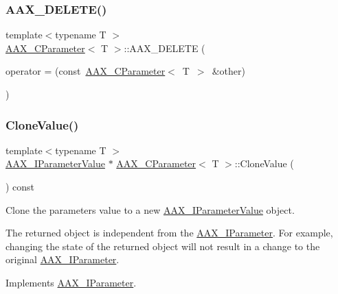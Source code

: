 \subsubsection{\texorpdfstring{AAX\_DELETE()}{AAX\_DELETE()}\hspace{0.1cm}{\footnotesize\ttfamily [3/3]}}
{\footnotesize\ttfamily template$<$typename T $>$ \\
\mbox{\hyperlink{a01537}{A\+A\+X\+\_\+\+C\+Parameter}}$<$ T $>$\+::A\+A\+X\+\_\+\+D\+E\+L\+E\+TE (\begin{DoxyParamCaption}\item[{\mbox{\hyperlink{a01537}{A\+A\+X\+\_\+\+C\+Parameter}}$<$ T $>$ \&}]{operator = {\ttfamily (const~\mbox{\hyperlink{a01537}{A\+A\+X\+\_\+\+C\+Parameter}}$<$~T~$>$~\&other)} }\end{DoxyParamCaption})}

\mbox{\label{a01537_a7677ba568ddf62f7393ea76c154dc397}} 
\subsubsection{\texorpdfstring{CloneValue()}{CloneValue()}}
{\footnotesize\ttfamily template$<$typename T $>$ \\
\mbox{\hyperlink{a01853}{A\+A\+X\+\_\+\+I\+Parameter\+Value}} $\ast$ \mbox{\hyperlink{a01537}{A\+A\+X\+\_\+\+C\+Parameter}}$<$ T $>$\+::Clone\+Value (\begin{DoxyParamCaption}{ }\end{DoxyParamCaption}) const\hspace{0.3cm}{\ttfamily [virtual]}}



Clone the parameter\textquotesingle{}s value to a new \mbox{\hyperlink{a01853}{A\+A\+X\+\_\+\+I\+Parameter\+Value}} object. 

The returned object is independent from the \mbox{\hyperlink{a01857}{A\+A\+X\+\_\+\+I\+Parameter}}. For example, changing the state of the returned object will not result in a change to the original \mbox{\hyperlink{a01857}{A\+A\+X\+\_\+\+I\+Parameter}}. 

Implements \mbox{\hyperlink{a01857_a85ce34797e0a9bb3cf05458757144cb9}{A\+A\+X\+\_\+\+I\+Parameter}}.

\mbox{\label{a01537_aedf516885af595cae5d07dee050d9792}} 
